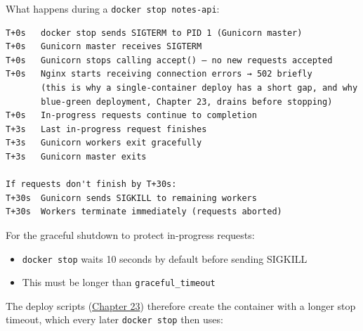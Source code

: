 \noindent{}What happens during a \texttt{docker\ stop\ notes-api}:

\begin{outputbox}[short]
\begin{Verbatim}[fontsize=\codesize, breaklines, breakanywhere, breaksymbolleft={\tiny\textcolor{muted}{$\hookrightarrow$}}]
T+0s   docker stop sends SIGTERM to PID 1 (Gunicorn master)
T+0s   Gunicorn master receives SIGTERM
T+0s   Gunicorn stops calling accept() — no new requests accepted
T+0s   Nginx starts receiving connection errors → 502 briefly
       (this is why a single-container deploy has a short gap, and why
       blue-green deployment, Chapter 23, drains before stopping)
T+0s   In-progress requests continue to completion
T+3s   Last in-progress request finishes
T+3s   Gunicorn workers exit gracefully
T+3s   Gunicorn master exits

If requests don't finish by T+30s:
T+30s  Gunicorn sends SIGKILL to remaining workers
T+30s  Workers terminate immediately (requests aborted)
\end{Verbatim}
\end{outputbox}

\noindent{}For the graceful shutdown to protect in-progress requests:

\begin{itemize}
\tightlist
\item
  \texttt{docker\ stop} waits 10 seconds by default before sending SIGKILL
\item
  This must be longer than \texttt{graceful\_timeout}
\end{itemize}

\noindent{}The deploy scripts (\hyperref[ch:23-code-transfer]{Chapter 23}) therefore create the container with a longer stop timeout, which every later \texttt{docker\ stop} then uses:

\begin{codebox}[short]

\begin{Shaded}
\begin{Highlighting}[]

\end{Highlighting}
\end{Shaded}

\end{codebox}

